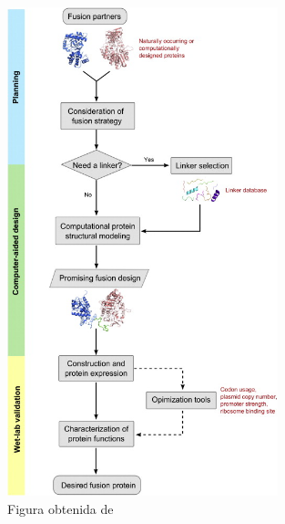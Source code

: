 \begin{figure}[htbp]
\centering
\includegraphics[width=0.7\textwidth]{img/esquemaProcesoFusion.jpg} 
\caption{Figura obtenida de \cite{yu2015synthetic}}
\label{esquemaProcesoFusion}
\end{figure}

